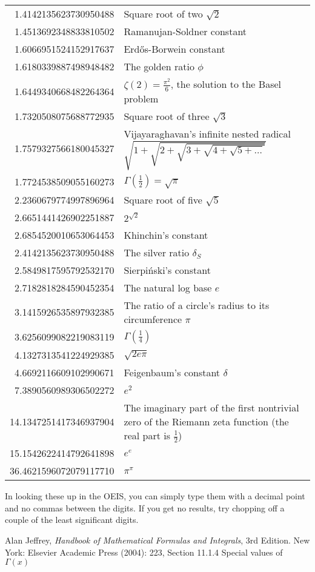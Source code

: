 \documentclass[12pt]{article}
\begin{document}
\begin{tabular}{|r|l|}
1.4142135623730950488 & Square root of two $\sqrt{2}$ \\
1.4513692348833810502 & Ramanujan-Soldner constant \\
1.6066951524152917637 & Erd\H{o}s-Borwein constant \\
1.6180339887498948482 & The golden ratio $\phi$ \\
1.6449340668482264364 & $\zeta(2) = \frac{\pi^2}{6}$, the solution to the Basel problem \\
1.7320508075688772935 & Square root of three $\sqrt{3}$ \\
1.7579327566180045327 & Vijayaraghavan's infinite nested radical $\sqrt{1 + \sqrt{2 + \sqrt{3 + \sqrt{4 + \sqrt{5 + \ldots }}}}}$ \\
1.7724538509055160273 & $\Gamma(\frac{1}{2}) = \sqrt{\pi}$ \\
2.2360679774997896964 & Square root of five $\sqrt{5}$ \\
2.6651441426902251887 & $2^{\sqrt{2}}$ \\
2.6854520010653064453 & Khinchin's constant \\
2.4142135623730950488 & The silver ratio $\delta_{S}$ \\
2.5849817595792532170 & Sierpi\'nski's constant \\
2.7182818284590452354 & The natural log base $e$ \\
3.1415926535897932385 & The ratio of a circle's radius to its circumference $\pi$ \\
3.6256099082219083119 & $\Gamma(\frac{1}{4})$ \\
4.1327313541224929385 & $\sqrt{2 e \pi}$ \\
4.6692116609102990671 & Feigenbaum's constant $\delta$ \\
7.3890560989306502272 & $e^2$ \\
14.1347251417346937904 & The imaginary part of the first nontrivial zero of the Riemann zeta function (the real part is $\frac{1}{2}$) \\
15.1542622414792641898 & $e^e$ \\
36.4621596072079117710 & $\pi^\pi$ \\
\end{tabular}

In looking these up in the OEIS, you can simply type them with a decimal point and no commas between the digits. If you get no results, try chopping off a couple of the least significant digits.

\begin{thebibliography}{1}
 Alan Jeffrey, {\it Handbook of Mathematical Formulas and Integrals}, 3rd Edition. New York: Elsevier Academic Press (2004): 223, Section 11.1.4 Special values of $\Gamma(x)$
\end{thebibliography}

\end{document}
